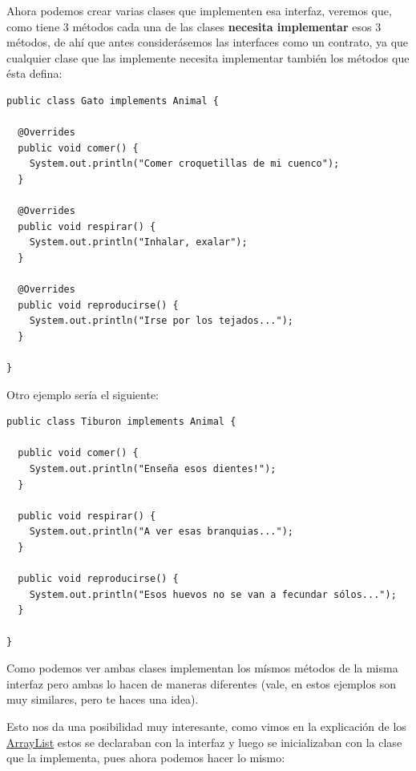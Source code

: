 \documentclass[11pt]{article}
\begin{document}
Ahora podemos crear varias clases que implementen esa interfaz, veremos que, como tiene 3 métodos cada una de las clases \textbf{necesita implementar} esos 3 métodos, de ahí que antes considerásemos las interfaces como un contrato, ya que cualquier clase que las implemente necesita implementar también los métodos que ésta defina:

\begin{verbatim}
public class Gato implements Animal {

  @Overrides
  public void comer() {
    System.out.println("Comer croquetillas de mi cuenco");
  }

  @Overrides
  public void respirar() {
    System.out.println("Inhalar, exalar");
  }

  @Overrides
  public void reproducirse() {
    System.out.println("Irse por los tejados...");
  }

}
\end{verbatim}

Otro ejemplo sería el siguiente:

\begin{verbatim}
public class Tiburon implements Animal {

  public void comer() {
    System.out.println("Enseña esos dientes!");
  }

  public void respirar() {
    System.out.println("A ver esas branquias...");
  }

  public void reproducirse() {
    System.out.println("Esos huevos no se van a fecundar sólos...");
  }

}
\end{verbatim}

Como podemos ver ambas clases implementan los mísmos métodos de la misma interfaz pero ambas lo hacen de maneras diferentes (vale, en estos ejemplos son muy similares, pero te haces una idea).

Esto nos da una posibilidad muy interesante, como vimos en la explicación de los \hyperref[org396868c]{ArrayList} estos se declaraban con la interfaz y luego se inicializaban con la clase que la implementa, pues ahora podemos hacer lo mismo:
\end{document}
